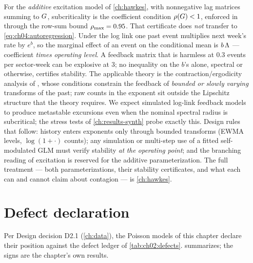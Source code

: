 \begin{warning}\label{warn:ch04:loglinkstability}
For the \emph{additive} excitation model of \cref{ch:hawkes}, with
nonnegative lag matrices summing to $G$, subcriticality is the
coefficient condition $\rho\!\left(G\right) < 1$, enforced in
 through the row-sum bound $\rho_{\max} = 0.95$.
That certificate does \emph{not} transfer to
\cref{eq:ch04:autoregression}. Under the log link one past event
multiplies next week's rate by $e^{b}$, so the marginal effect of an
event on the conditional mean is $b\,\Lambda$ --- coefficient \emph{times
operating level}. A feedback matrix that is harmless at $0.3$ events per
sector-week can be explosive at $3$; no inequality on the $b$'s alone,
spectral or otherwise, certifies stability. The applicable theory is the
contraction/ergodicity analysis of \citet{fokianos2011}, whose conditions
constrain the feedback of \emph{bounded or slowly varying} transforms of
the past; raw counts in the exponent sit outside the Lipschitz structure
that the theory requires. We expect simulated log-link feedback models to
produce metastable excursions even when the nominal spectral radius is
subcritical; the stress tests of \cref{ch:results-synth} probe exactly
this. Design rules that follow:
history enters exponents only through bounded transforms (EWMA levels,
$\log(1+\cdot)$ counts); any simulation or multi-step use of a fitted
self-modulated GLM must verify stability \emph{at the operating point};
and the branching reading of excitation is reserved for the additive
parameterization. The full treatment --- both parameterizations, their
stability certificates, and what each can and cannot claim about
contagion --- is \cref{ch:hawkes}.
\end{warning}

\section{Defect declaration}\label{ch04:sec:defects}

Per Design decision D2.1 (\cref{ch:data}), the Poisson models of this
chapter declare their position against the defect ledger of
\cref{tab:ch02:defects}.  summarizes; the signs
are the chapter's own results.

